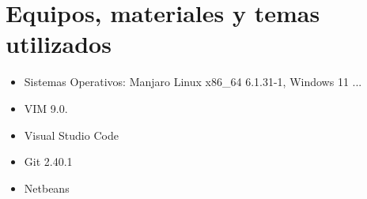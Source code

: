 \section{Equipos, materiales y temas utilizados}
\begin{itemize}
	\item Sistemas Operativos: Manjaro Linux x86\_64 6.1.31-1, Windows 11 ...
	\item VIM 9.0.
	\item Visual Studio Code
	\item Git 2.40.1
	\item Netbeans
\end{itemize}